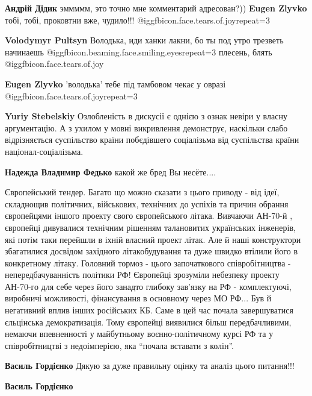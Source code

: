 \begin{itemize}
\begin{itemize}
\begin{itemize}
\textbf{Андрій Дідик} эммммм, это точно мне комментарий адресован?))
\textbf{Eugen Zlyvko} тобі, тобі, проковтни вже, чудило!!! @igg{fbicon.face.tears.of.joy}{repeat=3} 

\textbf{Volodymyr Pultsyn} Володька, иди ханки лакни, бо ты под утро трезветь начинаешь  @igg{fbicon.beaming.face.smiling.eyes}{repeat=3}  плесень, блять  @igg{fbicon.face.tears.of.joy} 

\textbf{Eugen Zlyvko} 'володька' тебе під тамбовом чекає у овразі @igg{fbicon.face.tears.of.joy}{repeat=3} 

\textbf{Yuriy Stebelskiy} Озлобленість в дискусії є однією з ознак невіри у власну аргументацію. А з ухилом у мовні викривлення демонструє, наскільки слабо відрізняється суспільство країни побєдівшего соціалізьма від суспільства країни націонал-соціалізьма.

\textbf{Надежда Владимир Федько} какой же бред Вы несёте....

\end{itemize} %


Європейський тендер. Багато що можно сказати з цього приводу - від ідеї,
складнощив політичних, військових, технічних до успіхів та причин обрання
європейцями іншого проекту свого європейського літака. Вивчаючи АН-70-й ,
європейці дивувалися технічним рішенням талановитих українських інженерів, які
потім таки перейшли в іхній власний проект літак. Але й наші конструктори
збагатилися досвідом західного літакобудування та дуже швидко втілили його в
конкретному літаку. Головний тормоз - цього започаткового співробітництва -
непередбачуванність політики РФ! Європейці зрозуміли небезпеку проекту АН-70-го
для себе через його занадто глибоку зав'язку на РФ - комплектуючі, виробничі
можливості, фінансування в основному через МО РФ... Був й негативний вплив
інших російських КБ. Саме в цей час почала завершуватися єльцінська
демократизація. Тому європейці виявилися більш передбачливими, немаючи
впевненності у майбутньому воєнно-політичному курсі РФ та у співробітництві з
недоімперією, яка \enquote{почала вставати з колін}.

\begin{itemize} %
\textbf{Василь Гордієнко} Дякую за дуже правильну оцінку та аналіз цього питання!!!

\textbf{Василь Гордієнко} 


\end{itemize}
\end{itemize}
\end{itemize}
